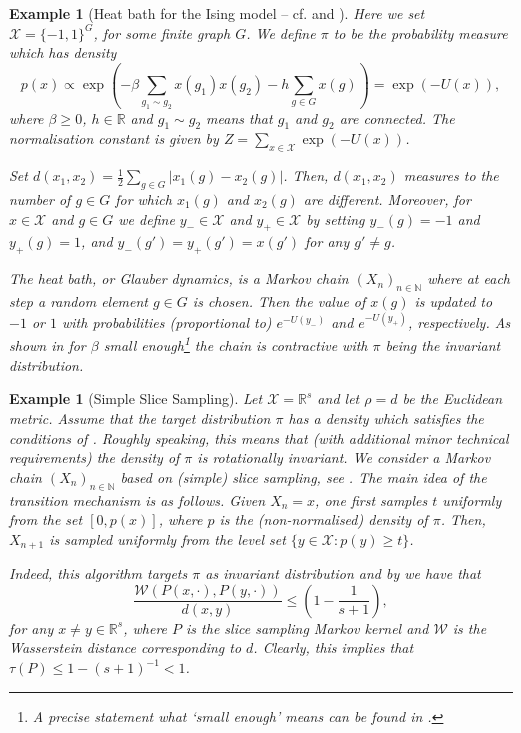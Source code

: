 \documentclass[12pt]{article}
\theoremstyle{plain}
\newtheorem{example}[thm]{Example}
\newcommand{\N}{\mathbb{N}}
\newcommand{\R}{\mathbb{R}}
\newcommand{\cX}{\mathcal{X}}
\begin{document}
\begin{example}[{Heat bath for the Ising model -- cf. \cite[Example 17]{ollivier2009ricci} and \cite[Section 2.2]{Joulin2010Curvature}}]
Here we set $\cX = \{-1,1\}^G$, for some finite graph $G$. We define $\pi$ to be the probability measure which has density 
\[
p(x) \propto \exp \left( - \beta\sum_{g_1 \sim g_2} x(g_1)x(g_2) - h \sum_{g \in G} x(g) \right) = \exp (-U(x)),
\]
where $\beta\geq 0$, $h \in \R$ and $g_1 \sim g_2$ means that $g_1$ and $g_2$ are connected. 
The normalisation constant is given by $Z = \sum_{x \in \cX} \exp(-U(x))$. 

Set $d(x_1,x_2) = \frac{1}{2}\sum_{g \in G} \vert x_1(g)- x_2(g) \vert$. Then, $d(x_1, x_2)$ measures to the number of $g \in G$ for which $x_1(g)$ and $x_2(g)$ are different.  
Moreover, for $x \in \cX$ and $g \in G$ we define $y_-\in \cX$ and $y_+ \in \cX$ by setting $y_-(g)=-1$ and $y_+(g)=1$, and $y_-(g') = y_+(g') = x(g')$ for any $g' \neq g$.

The heat bath, or Glauber dynamics, is a Markov chain $(X_n)_{n \in \N}$ where at each step a random element $g \in G$ is chosen. Then the value of $x(g)$ is updated to $-1$ or $1$ with probabilities (proportional to) $e^{-U(y_-)}$ and $e^{-U(y_+)}$, respectively. 
As shown in \cite{ollivier2009ricci, Joulin2010Curvature} for $\beta$ small enough\footnote{A precise statement what `small enough' means can be found in \cite[Example 17]{ollivier2009ricci}.} the chain is contractive with $\pi$ being the invariant distribution.
\end{example}





\begin{example}[Simple Slice Sampling]\label{ex:simple_slice_sampling}
Let $\cX = \R^s$ and let $\rho = d $ be the Euclidean metric.
Assume that the target distribution $\pi$ has a density which satisfies the conditions of \cite[Theorem 2.1]{natarovskii2021quantitative}. 
Roughly speaking, this means that (with additional minor technical requirements) the density of $\pi$ is rotationally invariant. 
We consider a Markov chain $(X_n)_{n \in \N}$ based on (simple) slice sampling, see \cite[Algorithm 1.1]{natarovskii2021quantitative}.
The main idea of the transition mechanism is as follows. 
Given $X_n = x$, one first samples $t$ uniformly from the set $[0, p(x)]$, where $p$ is the (non-normalised) density of $\pi$. Then, $X_{n+1}$ is sampled uniformly from the level set $\{y \in \cX \colon p(y) \geq t\}$.

Indeed, this algorithm targets $\pi$ as invariant distribution and by \cite[Theorem 2.1]{natarovskii2021quantitative} we have that 
\[
\frac{\mathcal{W}(P(x, \cdot ) , P(y, \cdot )) }{d(x,y)} \leq \left( 1- \frac{1}{s+1}\right),
\]
for any $x \neq y \in \R^s$,
where $P$ is the slice sampling Markov kernel and $\mathcal{W}$ is the Wasserstein distance corresponding to $d$. 
Clearly, this implies that $\tau(P) \leq  1- (s+1)^{-1} <1$.
\end{example}
\end{document}
